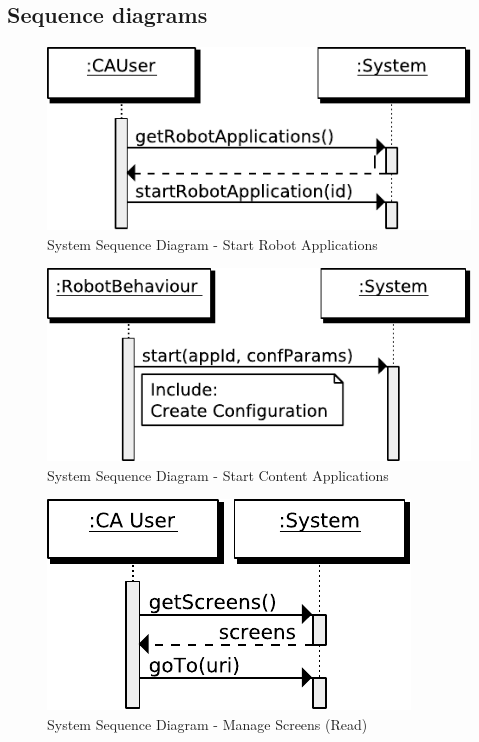 \subsection{Sequence diagrams}
\begin{figure}[htb]
    \centering
    \includegraphics{figures/spec-seq-start-qtapp.pdf}
    \caption{System Sequence Diagram - Start Robot Applications}
    \label{fig:spec-start-qtapp}
\end{figure}

\begin{figure}[htb]
    \centering
    \includegraphics{figures/spec-seq-start-contents-app.pdf}
    \caption{System Sequence Diagram - Start Content Applications}
    \label{fig:spec-start-ca}
\end{figure}

\begin{figure}[htb]
    \centering
    \includegraphics{figures/spec-seq-manage-screens-read.pdf}
    \caption{System Sequence Diagram - Manage Screens (Read)}
    \label{fig:spec-manage-screens-read}
\end{figure}


